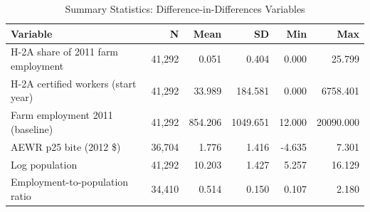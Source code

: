 \begin{table}[htbp]
\centering
\caption{Summary Statistics: Difference-in-Differences Variables}
\label{tab:sumstats}
\begin{tabular}{lrrrrr}
\hline\hline
Variable & N & Mean & SD & Min & Max \\
\hline
H-2A share of 2011 farm employment & 41,292 & 0.051 & 0.404 & 0.000 & 25.799 \\
H-2A certified workers (start year) & 41,292 & 33.989 & 184.581 & 0.000 & 6758.401 \\
Farm employment 2011 (baseline) & 41,292 & 854.206 & 1049.651 & 12.000 & 20090.000 \\
AEWR p25 bite (2012 \$) & 36,704 & 1.776 & 1.416 & -4.635 & 7.301 \\
Log population & 41,292 & 10.203 & 1.427 & 5.257 & 16.129 \\
Employment-to-population ratio & 34,410 & 0.514 & 0.150 & 0.107 & 2.180 \\
\hline\hline
\end{tabular}
\end{table}
